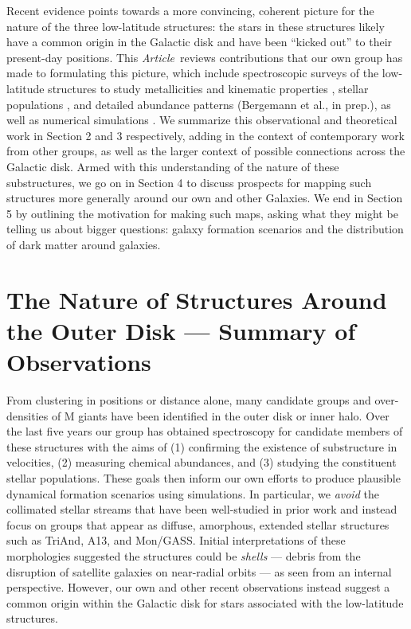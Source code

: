 \documentclass[galaxies,article,submit,moreauthors,pdftex,10pt,a4paper]{mdpi}
\newcommand{\documentname}{\emph{Article}}
\begin{document}
Recent evidence points towards a more convincing, coherent picture for the
nature of the three low-latitude structures: the stars in these structures
likely have a common origin in the Galactic disk and have been ``kicked out''
to their present-day positions.
This \documentname\ reviews contributions that our own group has made to formulating this picture, which include spectroscopic surveys of the low-latitude structures to study metallicities and kinematic properties \cite{sheffield14,li17}, stellar populations \cite{pricewhelan15}, and detailed abundance patterns (Bergemann et al., in prep.), as well as numerical simulations \cite{sheffield14,pricewhelan15,laporte16}.
We summarize this observational and theoretical work in Section 2 and 3 respectively, adding in the context of contemporary work from other groups, as well as the larger context of possible connections across the Galactic disk.
Armed with this understanding of the nature of these substructures, we go on in Section 4 to discuss prospects for mapping such structures more generally around our own and other Galaxies.
We end in Section 5 by outlining the motivation for making such maps, asking what they might be telling us about bigger questions: galaxy formation scenarios and the distribution of dark matter around galaxies.

\section{The Nature of Structures Around the Outer Disk --- Summary of Observations}
\label{sec:obs}

From clustering in positions or distance alone, many candidate groups and
over-densities of M giants have been identified in the outer disk or inner halo.
Over the last five years our group has obtained spectroscopy for
candidate members of these structures with the aims of (1) confirming the
existence of substructure in velocities, (2) measuring chemical abundances, and
(3) studying the constituent stellar populations.
These goals then inform our own efforts to produce plausible dynamical
formation scenarios using simulations.
In particular, we {\it avoid} the collimated stellar streams that have been
well-studied in prior work \cite[such as Sgr, Orphan, GD1 and Pal 5 --- see,
e.g.,][]{law10,koposov10,kuepper15,bovy16} and instead focus on groups that
appear as diffuse, amorphous, extended stellar structures such as TriAnd, A13,
and Mon/GASS.
Initial interpretations of these morphologies suggested the structures could be
{\it shells} --- debris from the disruption of satellite galaxies on near-radial
orbits \cite{johnston08} --- as seen from an internal perspective.
However, our own and other recent observations instead suggest a common origin
within the Galactic disk for stars associated with the low-latitude structures.
\end{document}
